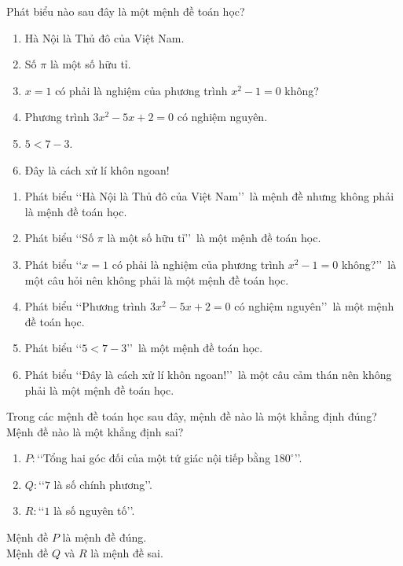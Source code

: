 \begin{vd}%
	Phát biểu nào sau đây là một mệnh đề toán học?
	\begin{enumerate}
		\item Hà Nội là Thủ đô của Việt Nam.
		\item Số $\pi$ là một số hữu tỉ.
		\item $x=1$ có phải là nghiệm của phương trình $x^2-1=0$ không?
		\item Phương trình $3x^2-5x+2=0$ có nghiệm nguyên.
		\item $5<7-3$.
		\item Đây là cách xử lí khôn ngoan!
	\end{enumerate}
	\loigiai
	{
		\begin{enumerate}
			\item Phát biểu \lq\lq Hà Nội là Thủ đô của Việt Nam\rq\rq\ là mệnh đề nhưng không phải là mệnh đề toán học.
			\item Phát biểu \lq\lq Số $\pi$ là một số hữu tỉ\rq\rq\ là một mệnh đề toán học.
			\item Phát biểu \lq\lq $x=1$ có phải là nghiệm của phương trình $x^2-1=0$ không?\rq\rq\ là một câu hỏi nên không phải là một mệnh đề toán học.
			\item Phát biểu \lq\lq Phương trình $3x^2-5x+2=0$ có nghiệm nguyên\rq\rq\ là một mệnh đề toán học.
			\item Phát biểu \lq\lq $5<7-3$\rq\rq\ là một mệnh đề toán học.
			\item Phát biểu \lq\lq Đây là cách xử lí khôn ngoan!\rq\rq\ là một câu cảm thán nên không phải là một mệnh đề toán học.
		\end{enumerate}
	}
\end{vd}

\begin{vd}%
	Trong các mệnh đề toán học sau đây, mệnh đề nào là một khẳng định đúng? Mệnh đề nào là một khẳng định sai?
	\begin{enumerate}
		\item $P\colon$\lq\lq Tổng hai góc đối của một tứ giác nội tiếp bằng $180^{\circ}$\rq\rq.
		\item $Q\colon$\lq\lq $7$ là số chính phương\rq\rq.
		\item $R\colon$\lq\lq $1$ là số nguyên tố\rq\rq.
	\end{enumerate}
	\loigiai
	{
		Mệnh đề $P$ là mệnh đề đúng. \\
		Mệnh đề $Q$ và $R$ là mệnh đề sai. \\
	}
\end{vd}

